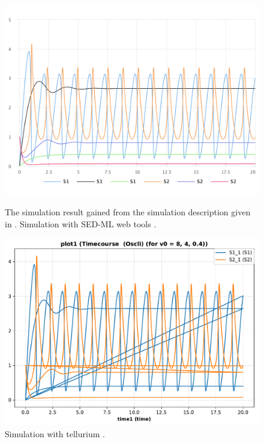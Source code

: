 \begin{figure}[ht]
    \centering
    \begin{minipage}{0.47\textwidth}
        \centering
        \includegraphics[width=1.0\textwidth]{examples/repeated-scan-oscli/results/sedml_webtools/plot1}
        \caption{The simulation result gained from the simulation description given in . Simulation with SED-ML web tools \citep{bergmann2017sed}.}
    \end{minipage}\hfill
    \begin{minipage}{0.47\textwidth}
        \centering
                \includegraphics[width=1.0\textwidth]{examples/repeated-scan-oscli/results/tellurium/plot1}
        \caption{Simulation with tellurium \citep{tellurium}.}
    \end{minipage}
    \label{fig:repeated-scan-oscli}
\end{figure}

